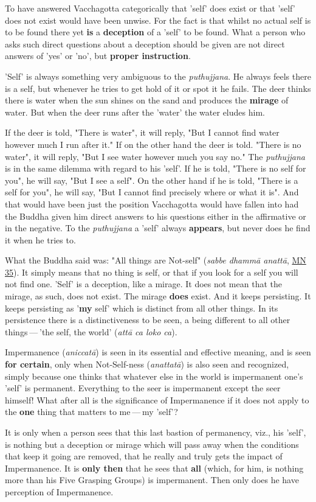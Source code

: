 To have answered Vacchagotta categorically that 'self' does exist or that 'self' does not exist would have been unwise. For the fact is that whilst no actual self is to be found there yet \textbf{is} a \textbf{deception} of a 'self' to be found. What a person who asks such direct questions about a deception should be given are not direct answers of 'yes' or 'no', but \textbf{proper instruction}.

'Self' is always something very ambiguous to the \emph{puthujjana}. He always feels there is a self, but whenever he tries to get hold of it or spot it he fails. The deer thinks there is water when the sun shines on the sand and produces the \textbf{mirage} of water. But when the deer runs after the 'water' the water eludes him.

If the deer is told, "There is water", it will reply, "But I cannot find water however much I run after it." If on the other hand the deer is told. "There is no water", it will reply, "But I see water however much you say no." The \emph{puthujjana} is in the same dilemma with regard to his 'self'. If he is told, "There is no self for you", he will say, "But I see a self". On the other hand if he is told, "There is a self for you", he will say, "But I cannot find precisely where or what it is". And that would have been just the position Vacchagotta would have fallen into had the Buddha given him direct answers to his questions either in the affirmative or in the negative. To the \emph{puthujjana} a 'self' always \textbf{appears}, but never does he find it when he tries to.

What the Buddha said was: "All things are Not-self" (\emph{sabbe dhammā anattā}, \href{https://suttacentral.net/mn35/en/sujato}{MN 35}). It simply means that no thing is self, or that if you look for a self you will not find one. 'Self' is a deception, like a mirage. It does not mean that the mirage, as such, does not exist. The mirage \textbf{does} exist. And it keeps persisting. It keeps persisting as '\textbf{my} self' which is distinct from all other things. In its persistence there is a distinctiveness to be seen, a being different to all other things --- 'the self, the world' (\emph{attā ca loko ca}).

Impermanence (\emph{aniccatā}) is seen in its essential and effective meaning, and is seen \textbf{for certain}, only when Not-Self-ness (\emph{anattatā}) is also seen and recognized, simply because one thinks that whatever else in the world is impermanent one's 'self' is permanent. Everything to the seer is impermanent except the seer himself! What after all is the significance of Impermanence if it does not apply to the \textbf{one} thing that matters to me --- my 'self'?

It is only when a person sees that this last bastion of permanency, viz., his 'self', is nothing but a deception or mirage which will pass away when the conditions that keep it going are removed, that he really and truly gets the impact of Impermanence. It is \textbf{only then} that he sees that \textbf{all} (which, for him, is nothing more than his Five Grasping Groups) is impermanent. Then only does he have perception of Impermanence.
